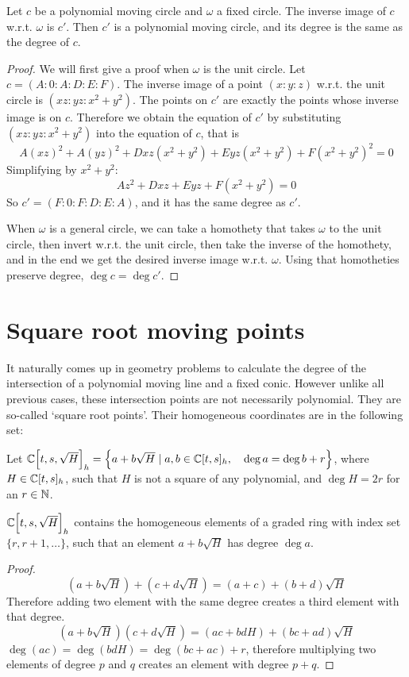 \documentclass[a4paper]{article}
\begin{document}
\begin{theorem}
    Let $c$ be a polynomial moving circle and $\omega$ a fixed circle. The inverse image of $c$ w.r.t. $\omega$ is $c'$. Then $c'$ is a polynomial moving circle, and its degree is the same as the degree of $c$.
\end{theorem}
\begin{proof}
    We will first give a proof when $\omega$ is the unit circle. Let $c=(A:0:A:D:E:F)$. The inverse image of a point $(x:y:z)$ w.r.t. the unit circle is $(xz:yz:x^2+y^2)$. The points on $c'$ are exactly the points whose inverse image is on $c$. Therefore we obtain the equation of $c'$ by substituting $(xz:yz:x^2+y^2)$ into the equation of $c$, that is
    $$A(xz)^2+A(yz)^2+Dxz(x^2+y^2)+Eyz(x^2+y^2)+F(x^2+y^2)^2=0$$
    Simplifying by $x^2+y^2$:
    $$Az^2+Dxz+Eyz+F(x^2+y^2)=0$$
    So $c'=(F:0:F:D:E:A)$, and it has the same degree as $c'$.

    When $\omega$ is a general circle, we can take a homothety that takes $\omega$ to the unit circle, then invert w.r.t. the unit circle, then take the inverse of the homothety, and in the end we get the desired inverse image w.r.t. $\omega$. Using that homotheties preserve degree, $\deg c=\deg c'$.
\end{proof}

\section{Square root moving points}


It naturally comes up in geometry problems to calculate the degree of the intersection of a polynomial moving line and a fixed conic. However unlike all previous cases, these intersection points are not necessarily polynomial. They are so-called `square root points'. Their homogeneous coordinates are in the following set:

Let $\mathbb{C}\Bigl[t,s,\sqrt{H}\Bigr]_h=\Bigl\{a+b\sqrt{H}\mid a,b\in \mathbb{C}[t,s]_h,\quad \deg a=\deg b+r\Bigr\}$, where $H\in \mathbb{C}[t,s]_h$, such that $H$ is not a square of any polynomial, and $\deg H=2r$ for an $r\in \mathbb{N}$.

\begin{lemma}
    $\mathbb{C}\Bigl[t,s,\sqrt{H}\Bigr]_h$ contains the homogeneous elements of a graded ring with index set $\{r,r+1,\ldots\}$, such that an element $a+b\sqrt{H}$ has degree $\deg a$.
\end{lemma}
\begin{proof}
    $$\left(a+b\sqrt{H}\right)+\left(c+d\sqrt{H}\right)=(a+c)+(b+d)\sqrt{H}$$
    Therefore adding two element with the same degree creates a third element with that degree.
    $$\left(a+b\sqrt{H}\right)\left(c+d\sqrt{H}\right)=(ac+bdH)+(bc+ad)\sqrt{H}$$
    $\deg (ac)=\deg (bdH)=\deg (bc+ac)+r$, therefore multiplying two elements of degree $p$ and $q$ creates an element with degree $p+q$.
\end{proof}
\end{document}
